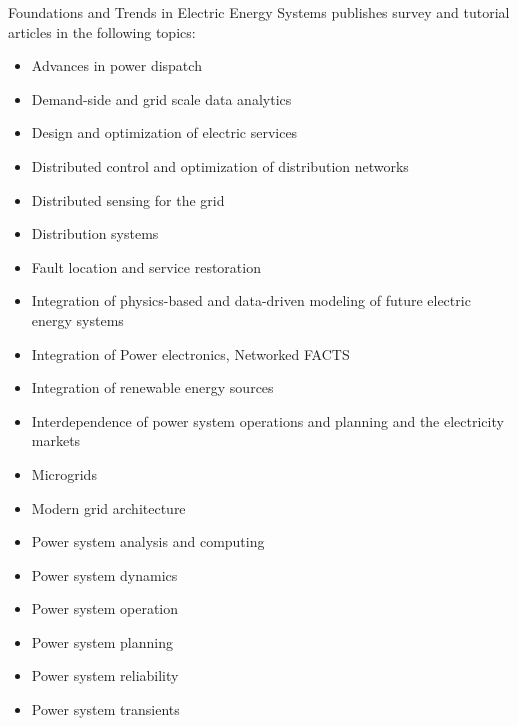


\journalaimsandscope
 {%
  Foundations and Trends\textsuperscript{\textregistered} in
Electric Energy Systems publishes
 survey and tutorial articles in the following topics:
 \begin{multicols}{2}\raggedcolumns
 \begin{itemize}
\item{Advances in power dispatch}
\item{Demand-side and grid scale data analytics}
\item{Design and optimization of electric services}
\item{Distributed control and optimization of distribution networks}
\item{Distributed sensing for the grid}
\item{Distribution systems}
\item{Fault location and service restoration}
\item{Integration of physics-based and data-driven modeling of future electric energy systems}
\item{Integration of Power electronics, Networked FACTS}
\item{Integration of renewable energy sources}
\item{Interdependence of power system operations and planning and the electricity markets}
\item{Microgrids}
\item{Modern grid architecture}
\item{Power system analysis and computing}
\item{Power system dynamics}
\item{Power system operation}
\item{Power system planning}
\item{Power system reliability}
\item{Power system transients}

\end{itemize}
\end{multicols}}
